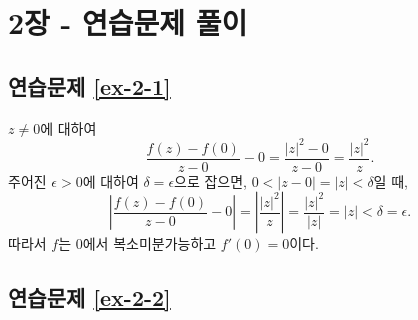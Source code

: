 
\section*{2장 - 연습문제 풀이}

\subsection*{연습문제 \ref{ex-2-1}}

$z\ne0$에 대하여
\[
\dfrac{f(z) - f(0)}{z-0} - 0 = \dfrac{|z|^2-0}{z-0} = \dfrac{|z|^2}z.
\]
주어진 $\epsilon>0$에 대하여 $ \delta=\epsilon$으로 잡으면,
$0<|z-0|=|z| <\delta$일 때,
\[
\left| \dfrac{f(z) - f(0)}{z-0} - 0\right|
= \left| \dfrac{|z|^2}z \right|  = \dfrac{|z|^2}{|z|} = |z| < \delta = \epsilon.
\]
따라서 $f$는 $0$에서 복소미분가능하고 $f'(0)=0$이다.

\subsection*{연습문제 \ref{ex-2-2}}








